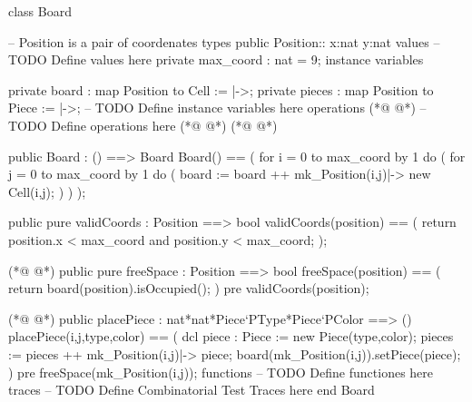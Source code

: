 \begin{vdmpp}[breaklines=true]
class Board

-- Position is a pair of coordenates
types
  public Position:: x:nat  y:nat
values
-- TODO Define values here
  private max_coord : nat = 9;
instance variables

 private board : map Position to Cell := {|->};
 private pieces : map  Position to Piece := {|->};
-- TODO Define instance variables here
operations
(*@
\label{validCoords:15}
@*)
-- TODO Define operations here
(*@
\label{Board:16}
@*)
(*@
\label{Cell:16}
@*)

  public Board : () ==> Board
   Board() ==
   (
    for i = 0 to max_coord by 1 do
    (
     for j = 0 to max_coord by 1 do
     (
       board := board ++ {mk_Position(i,j)|-> new Cell(i,j)};
     )
    )
  );

  public pure validCoords : Position ==> bool
  validCoords(position) ==
  (
   return position.x < max_coord and position.y < max_coord;
  );
  
(*@
\label{freeSpace:35}
@*)
  public pure freeSpace : Position ==> bool
  freeSpace(position) == 
  (
   return board(position).isOccupied();
  )
  pre validCoords(position);
  
(*@
\label{placePiece:42}
@*)
  public placePiece : nat*nat*Piece`PType*Piece`PColor ==> ()
  placePiece(i,j,type,color) == 
  (
   dcl piece : Piece := new Piece(type,color);
   pieces := pieces ++ {mk_Position(i,j)|-> piece};
   board(mk_Position(i,j)).setPiece(piece);
  )
  pre freeSpace(mk_Position(i,j));
functions
-- TODO Define functiones here
traces
-- TODO Define Combinatorial Test Traces here
end Board
\end{vdmpp}
